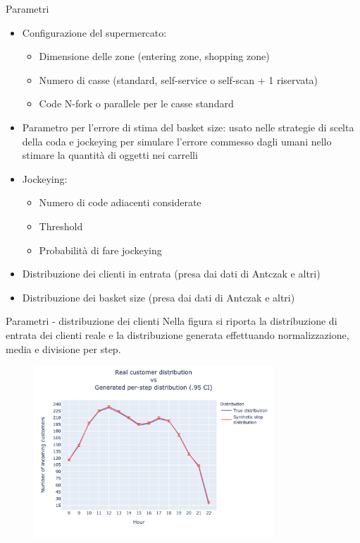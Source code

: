 \begin{frame}{Parametri}
	\begin{itemize}
		\item Configurazione del supermercato:
		\begin{itemize}
			\item Dimensione delle zone (entering zone, shopping zone)
			\item Numero di casse (standard, self-service o self-scan + 1 riservata)
			\item Code N-fork o parallele per le casse standard
		\end{itemize}
		\item Parametro per l'errore di stima del basket size: usato nelle strategie di scelta della coda e jockeying per simulare l'errore commesso dagli umani nello stimare la quantità di oggetti nei carrelli
		\item Jockeying:
		\begin{itemize}
			\item Numero di code adiacenti considerate
			\item Threshold
			\item Probabilità di fare jockeying
		\end{itemize}
		\item Distribuzione dei clienti in entrata (presa dai dati di Antczak e altri\footnotemark)
		\item Distribuzione dei basket size (presa dai dati di Antczak e altri\footnotemark[\value{footnote}])
	\end{itemize}
\end{frame}

\begin{frame}{Parametri - distribuzione dei clienti}
	Nella figura si riporta la distribuzione di entrata dei clienti reale e la distribuzione generata effettuando normalizzazione, media e divisione per step.
	\begin{figure}[H]
		\centering
		\includegraphics[width=9cm]{"../report/images/real_vs_synthetic_distribution.png"}
		\label{fig:dist_basket_size}
	\end{figure}
\end{frame}

